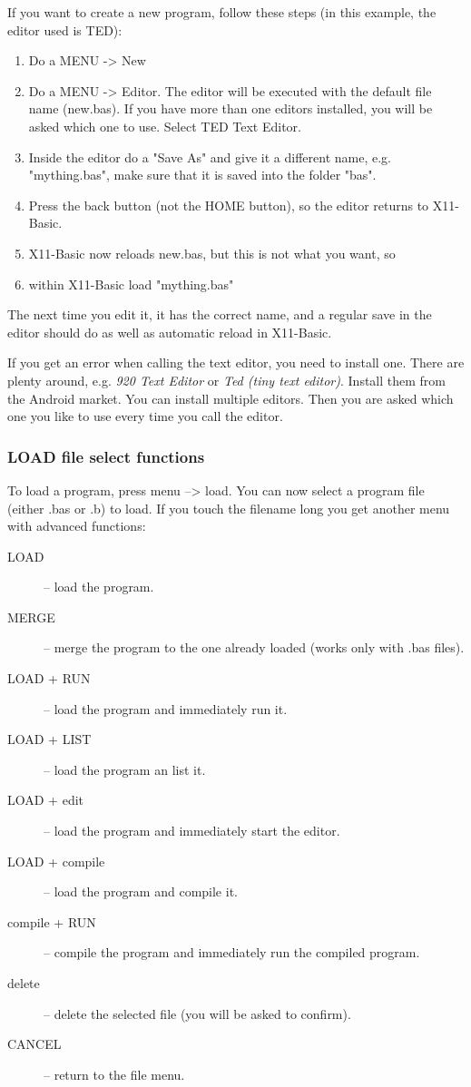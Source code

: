 If you want to create a new program, follow these steps  (in this example, the editor used is TED):

\begin{enumerate}
\item Do a MENU -> New
\item Do a MENU -> Editor. The editor will be executed with the default file name (new.bas). 
If you have more than one editors installed, you will be asked which one to use. Select TED Text Editor.
\item Inside the editor do a "Save As" and give it a different name, e.g. "mything.bas", make sure that it is saved 
into the folder "bas".
\item Press the back button (not the HOME button), so the editor returns to X11-Basic.
\item X11-Basic now reloads new.bas, but this is not what you want, so
\item within X11-Basic load "mything.bas"
\end{enumerate}
The next time you edit it, it has the correct name, and a regular save in the editor should do
 as well as automatic reload in X11-Basic.

If you get an error when calling the text editor, you need to install one. There
are plenty around, e.g. {\em 920 Text Editor} or {\em Ted (tiny text editor)}.
Install them from the Android market. You can install multiple editors. Then you
are asked which one you like to use every time you call the editor.

\subsubsection*{LOAD file select functions}

To load a program, press menu --> load. You can now select a program file 
(either .bas or .b) to load. If you touch the filename long you get another 
menu with advanced functions: 
\begin{description}
\item[LOAD] -- load the program.
\item[MERGE] -- merge the program to the one already loaded (works only with .bas files).
\item[LOAD + RUN] -- load the program and immediately run it.
\item[LOAD + LIST] -- load the program an list it.
\item[LOAD + edit] -- load the program and immediately start the editor.
\item[LOAD + compile] -- load the program and compile it.
\item[compile + RUN] -- compile the program and immediately run the compiled program.
\item[delete]   -- delete the selected file (you will be asked to confirm).
\item[CANCEL]   -- return to the file menu.
\end{description}

